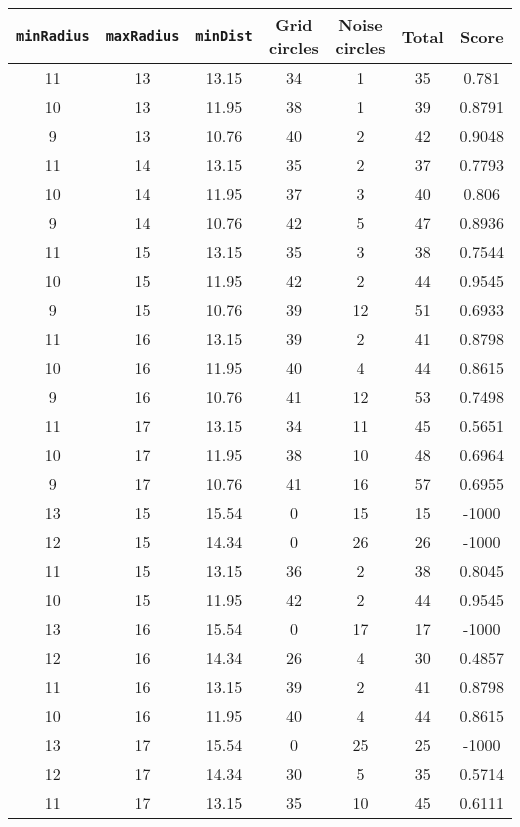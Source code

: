 \documentclass[letterpaper, 12pt]{article}
\begin{document}
\begin{longtable}{|c|c|c|c|c|c|c|}
\hline
\textbf{\texttt{minRadius}} & \textbf{\texttt{maxRadius}} & \textbf{\texttt{minDist}} & \textbf{Grid circles} & \textbf{Noise circles} & \textbf{Total} & \textbf{Score} \\
\hline
11 & 13 & 13.15 & 34 & 1 & 35 & 0.781 \\
\hline
10 & 13 & 11.95 & 38 & 1 & 39 & 0.8791 \\
\hline
9 & 13 & 10.76 & 40 & 2 & 42 & 0.9048 \\
\hline
11 & 14 & 13.15 & 35 & 2 & 37 & 0.7793 \\
\hline
10 & 14 & 11.95 & 37 & 3 & 40 & 0.806 \\
\hline
9 & 14 & 10.76 & 42 & 5 & 47 & 0.8936 \\
\hline
11 & 15 & 13.15 & 35 & 3 & 38 & 0.7544 \\
\hline
10 & 15 & 11.95 & 42 & 2 & 44 & 0.9545 \\
\hline
9 & 15 & 10.76 & 39 & 12 & 51 & 0.6933 \\
\hline
11 & 16 & 13.15 & 39 & 2 & 41 & 0.8798 \\
\hline
10 & 16 & 11.95 & 40 & 4 & 44 & 0.8615 \\
\hline
9 & 16 & 10.76 & 41 & 12 & 53 & 0.7498 \\
\hline
11 & 17 & 13.15 & 34 & 11 & 45 & 0.5651 \\
\hline
10 & 17 & 11.95 & 38 & 10 & 48 & 0.6964 \\
\hline
9 & 17 & 10.76 & 41 & 16 & 57 & 0.6955 \\
\hline
13 & 15 & 15.54 & 0 & 15 & 15 & -1000 \\
\hline
12 & 15 & 14.34 & 0 & 26 & 26 & -1000 \\
\hline
11 & 15 & 13.15 & 36 & 2 & 38 & 0.8045 \\
\hline
10 & 15 & 11.95 & 42 & 2 & 44 & 0.9545 \\
\hline
13 & 16 & 15.54 & 0 & 17 & 17 & -1000 \\
\hline
12 & 16 & 14.34 & 26 & 4 & 30 & 0.4857 \\
\hline
11 & 16 & 13.15 & 39 & 2 & 41 & 0.8798 \\
\hline
10 & 16 & 11.95 & 40 & 4 & 44 & 0.8615 \\
\hline
13 & 17 & 15.54 & 0 & 25 & 25 & -1000 \\
\hline
12 & 17 & 14.34 & 30 & 5 & 35 & 0.5714 \\
\hline
11 & 17 & 13.15 & 35 & 10 & 45 & 0.6111 \\

\end{longtable}
\end{document}
